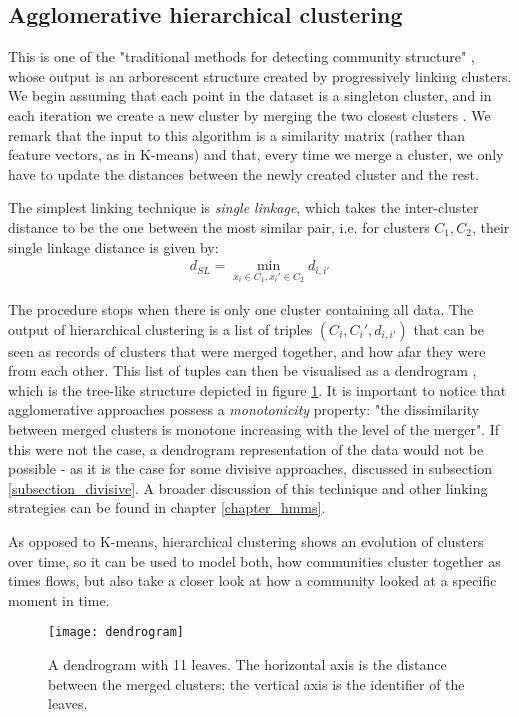 \documentclass[../main.tex]{subfiles} \label{chapter_soa}
\begin{document}
\subsection{Agglomerative hierarchical clustering} \label{subsection_hier}
This is one of the "traditional methods for detecting community structure" \cite{Girvan2002}, whose output is an arborescent structure created by progressively linking clusters. We begin assuming that each point in the dataset is a singleton cluster, and in each iteration we create a new cluster by merging the two closest clusters \cite{hastie2008}. We remark that the input to this algorithm is a similarity matrix (rather than feature vectors, as in K-means) and that, every time we merge a cluster, we only have to update the distances between the newly created cluster and the rest. 
\par The simplest linking technique is \emph{single linkage}, which takes the inter-cluster distance to be the one between the most similar pair, i.e. for clusters $C_1, C_2$, their single linkage distance is given by:
\begin{align*}
d_{SL} = \min_{x_i\in C_1, x_i'\in C_2}{d_{i,i'}}
\end{align*}
\par The procedure stops when there is only one cluster containing all data. The output of hierarchical clustering is a list of triples $(C_i, C_i', d_{i,i'})$ that can be seen as records of clusters that were merged together, and how afar they were from each other. This list of tuples can then be visualised as a dendrogram \cite{HAGMathworks}, which is the tree-like structure depicted in figure \ref{fig_hag}. It is important to notice that agglomerative approaches possess a \emph{monotonicity} property: "the dissimilarity between merged clusters is monotone increasing with the level of the merger". If this were not the case, a dendrogram representation of the data would not be possible \cite{hastie2008} - as it is the case for some divisive approaches, discussed in subsection \ref{subsection_divisive}. A broader discussion of this technique and other linking strategies can be found in chapter \ref{chapter_hmms}.
\par As opposed to K-means, hierarchical clustering shows an evolution of clusters over time, so it can be used to model both, how communities cluster together as times flows, but also take a closer look at how a community looked at a specific moment in time.
\begin{figure}[t]
\centering
\texttt{[image: dendrogram]}
\caption{A dendrogram with 11 leaves. The horizontal axis is the distance between the merged clusters; the vertical axis is the identifier of the leaves.}
\label{fig_hag}
\end{figure}
\end{document}
